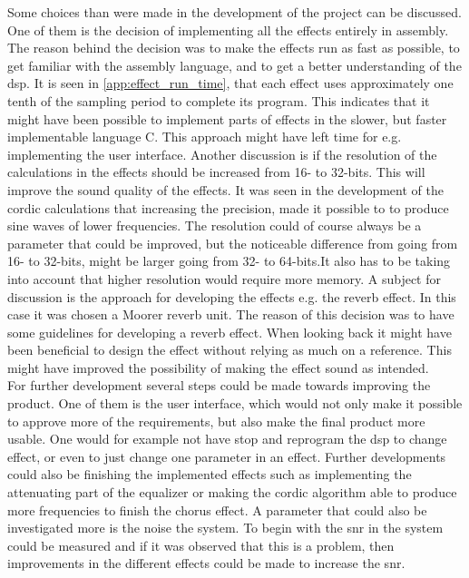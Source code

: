 Some choices than were made in the development of the project can be discussed. One of them is the decision of implementing all the effects entirely in assembly. The reason behind the decision was to make the effects run as fast as possible, to get familiar with the assembly language, and to get a better understanding of the \gls{dsp}. It is seen in \autoref{app:effect_run_time}, that each effect uses approximately one tenth of the sampling period to complete its program. This indicates that it might have been possible to implement parts of effects in the slower, but faster implementable language C. This approach might have left time for e.g. implementing the user interface. 
Another discussion is if the resolution of the calculations in the effects should be increased from 16- to 32-bits. This will improve the sound quality of the effects. It was seen in the development of the \gls{cordic} calculations that increasing the precision, made it possible to to produce sine waves of lower frequencies. The resolution could of course always be a parameter that could be improved, but the noticeable difference from going from 16- to 32-bits, might be larger going from 32- to 64-bits.It also has to be taking into account that higher resolution would require more memory.  
A subject for discussion is the approach for developing the effects e.g. the \gls{reverb} effect. In this case it was chosen a Moorer \gls{reverb} unit. The reason of this decision was to have some guidelines for developing a \gls{reverb} effect. When looking back it might have been beneficial to design the effect without relying as much on a reference. This might have improved the possibility  of making the effect sound as intended. \\

For further development several steps could be made towards improving the product. One of them is the user interface, which would not only make it possible to approve more of the requirements, but also make the final product more usable. One would for example not have stop and reprogram the \gls{dsp} to change effect, or even to just change one parameter in an effect. 
Further developments could also be finishing the implemented effects such as implementing the attenuating part of the equalizer or making the \gls{cordic} algorithm able to produce more frequencies to finish the chorus effect. 
A parameter that could also be investigated more is the noise the system. To begin with the \gls{snr} in the system could be measured and if it was observed that this is a problem, then improvements in the different effects could be made to increase the \gls{snr}.